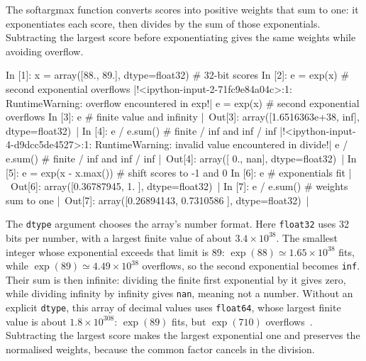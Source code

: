 \documentclass[11pt,a4paper]{article}
\renewcommand{\panetitle}{A terminal on \name{AlfMAC5}}
\begin{document}
\begin{tcolorbox}[enhanced, breakable, colback=white, opacityback=1, colframe=black!40, boxrule=0.5pt, arc=1pt, title={Why softargmax subtracts the maximum}, colbacktitle=black!6, coltitle=black, fonttitle=\small\bfseries]
The softargmax function converts scores into positive weights that sum to one: it exponentiates each score, then divides by the sum of those exponentials. Subtracting the largest score before exponentiating gives the same weights while avoiding overflow.


\begingroup
\renewcommand{\panetitle}{\name{IPython} on \name{AlfMAC4}}
\begin{pane}
In [1]: x = array([88., 89.], dtype=float32)  # 32-bit scores
In [2]: e = exp(x)  # second exponential overflows
|!<ipython-input-2-71fc9e84a04c>:1: RuntimeWarning: overflow encountered in exp!|
  e = exp(x)  # second exponential overflows
In [3]: e  # finite value and infinity
|~Out[3]: array([1.6516363e+38,           inf], dtype=float32)~|
In [4]: e / e.sum()  # finite / inf and inf / inf
|!<ipython-input-4-d9dcc5de4527>:1: RuntimeWarning: invalid value encountered in divide!|
  e / e.sum()  # finite / inf and inf / inf
|~Out[4]: array([ 0., nan], dtype=float32)~|
In [5]: e = exp(x - x.max())  # shift scores to -1 and 0
In [6]: e  # exponentials fit
|~Out[6]: array([0.36787945, 1.        ], dtype=float32)~|
In [7]: e / e.sum()  # weights sum to one
|~Out[7]: array([0.26894143, 0.7310586 ], dtype=float32)~|
\end{pane}
\endgroup

The \texttt{dtype} argument chooses the array's number format. Here \texttt{float32} uses 32 bits per number, with a largest finite value of about $3.4\times10^{38}$. The smallest integer whose exponential exceeds that limit is 89: $\exp(88)\simeq1.65\times10^{38}$ fits, while $\exp(89)\simeq4.49\times10^{38}$ overflows, so the second exponential becomes \texttt{inf}. Their sum is then infinite: dividing the finite first exponential by it gives zero, while dividing infinity by infinity gives \texttt{nan}, meaning not a number. Without an explicit \texttt{dtype}, this array of decimal values uses \texttt{float64}, whose largest finite value is about $1.8\times10^{308}$: $\exp(89)$ fits, but $\exp(710)$ overflows~\cite{numpytypes}. Subtracting the largest score makes the largest exponential one and preserves the normalised weights, because the common factor cancels in the division.

\end{tcolorbox}
\end{document}
